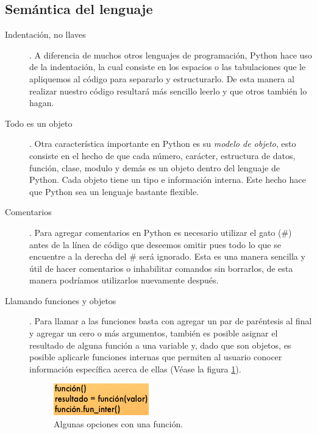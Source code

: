 \documentclass[a4paper]{article}
\begin{document}
\subsection{Semántica del lenguaje}

\begin{description}
\item[Indentación, no llaves].
\newline A diferencia de muchos otros lenguajes de programación, Python hace uso de la indentación, la cual consiste en los espacios o las tabulaciones que le apliquemos al código para separarlo y estructurarlo. De esta manera al realizar nuestro código resultará más sencillo leerlo y que otros también lo hagan.

\item[Todo es un objeto].
\newline Otra característica importante en Python es su \textit{modelo de objeto}, esto consiste en el hecho de que cada número, carácter, estructura de datos, función, clase, modulo y demás es un objeto dentro del lenguaje de Python. Cada objeto tiene un tipo e información interna. Este hecho hace que Python sea un lenguaje bastante flexible.

\item[Comentarios].
\newline Para agregar comentarios en Python es necesario utilizar el gato (\#) antes de la línea de código que deseemos omitir pues todo lo que se encuentre a la derecha del \# será ignorado. Esta es una manera sencilla y útil de hacer comentarios o inhabilitar comandos sin borrarlos, de esta manera podríamos utilizarlos nuevamente después.

\item[Llamando funciones y objetos].
\newline Para llamar a las funciones basta con agregar un par de paréntesis al final y agregar un cero o más argumentos, también es posible asignar el resultado de alguna función a una variable y, dado que son objetos, es posible aplicarle funciones internas que permiten al usuario conocer información específica acerca de ellas (Véase la figura \ref{fig:funcion}).

\begin{figure}[h!]
	\center
	\includegraphics[scale=.8]{./Images/Funcion}
	\caption{\label{fig:funcion} Algunas opciones con una función.}
\end{figure}


\end{description}
\end{document}
